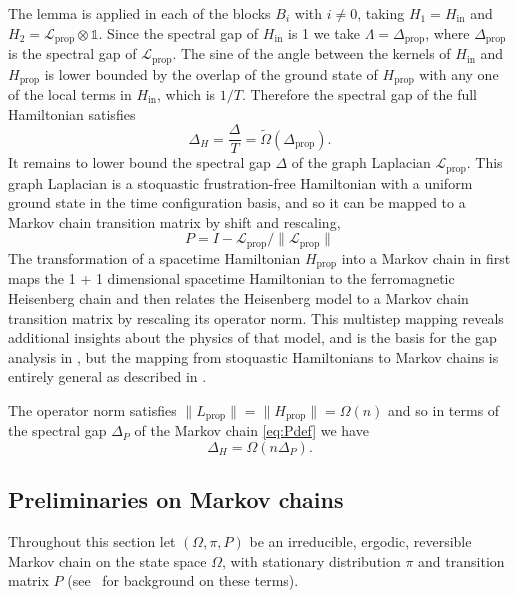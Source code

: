\documentclass[11pt,letterpaper]{article}
\theoremstyle{definition}
\theoremstyle{remark}
\numberwithin{equation}{section}
\theoremstyle{definition}
\newcommand{\wt}[1]{\widetilde{#1}}
\begin{document}
The lemma is applied in each of the blocks $B_i$ with $i \neq 0$, taking $H_1 = H_{\textrm{in}}$ and $H_2  = \mathcal{L}_{\textrm{prop}} \otimes \mathds{1}$.  Since the spectral gap of $H_{\textrm{in}}$ is 1 we take $\Lambda = \Delta_{\textrm{prop}}$, where $\Delta_{\textrm{prop}}$ is the spectral gap of $\mathcal{L}_{\textrm{prop}}$.  The sine of the angle between the kernels of $H_{\textrm{in}}$ and $H_{\textrm{prop}}$ is lower bounded by the overlap of the ground state of $H_{\textrm{prop}}$ with any one of the local terms in $H_{\textrm{in}}$, which is $1/T$.  Therefore the spectral gap of the full Hamiltonian satisfies
\begin{equation}
\Delta_H = \frac{\Delta}{T} = \wt{\Omega}(\Delta_{\textrm{prop}}).
\end{equation}
It remains to lower bound the spectral gap $\Delta$ of the graph Laplacian $\mathcal{L}_{\textrm{prop}}$.  This graph Laplacian is a stoquastic frustration-free Hamiltonian with a uniform ground state in the time configuration basis, and so it can be mapped to a Markov chain transition matrix by shift and rescaling,
\begin{equation}
P = I - \mathcal{L}_{\textrm{prop}}/ \|\mathcal{L}_\textrm{prop}\| \label{eq:Pdef}
\end{equation}
The transformation of a spacetime Hamiltonian $H_\textrm{prop}$ into a Markov chain in \cite{breuckmann2014space} first maps the 1 + 1 dimensional spacetime Hamiltonian to the ferromagnetic Heisenberg chain and then relates the Heisenberg model to a Markov chain transition matrix by rescaling its operator norm.  This multistep mapping reveals additional insights about the physics of that model, and is the basis for the gap analysis in \cite{breuckmann2014space}, but the mapping from stoquastic Hamiltonians to Markov chains is entirely general as described in \cite{crosson2017quantum}. 

The operator norm satisfies $\|L_\textrm{prop}\| = \|H_{\textrm{prop}}\| = \Omega(n)$ and so in terms of the spectral gap $\Delta_P$ of the Markov chain \eqref{eq:Pdef} we have
\begin{equation}
\Delta_H = \Omega(n \Delta_P). \label{eq:gapHP}
\end{equation}
\subsection{Preliminaries on Markov chains}
Throughout this section let $(\Omega,\pi,P)$ be an irreducible, ergodic, reversible Markov chain on the state space $\Omega$, with stationary distribution $\pi$ and transition matrix $P$ (see~\cite{levin2017markov} for background on these terms).   %
\end{document}
